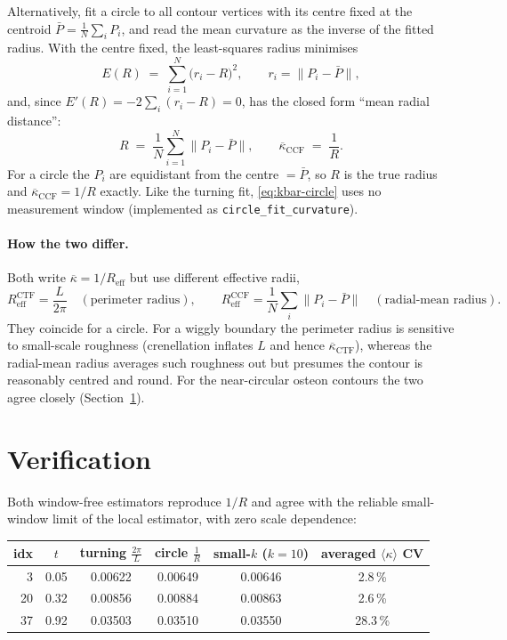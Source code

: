 \documentclass[11pt]{article}
\newcommand{\kbar}{\overline{\kappa}}
\newcommand{\code}[1]{\texttt{#1}}
\begin{document}
Alternatively, fit a circle to all contour vertices with its centre fixed at the
centroid $\bar P = \tfrac1N\sum_i P_i$, and read the mean curvature as the inverse
of the fitted radius. With the centre fixed, the least-squares radius minimises
\begin{equation}
  E(R) \;=\; \sum_{i=1}^{N}\bigl(r_i - R\bigr)^2,
  \qquad r_i = \lVert P_i - \bar P\rVert,
\end{equation}
and, since $E'(R) = -2\sum_i (r_i - R) = 0$, has the closed form ``mean radial
distance'':
\begin{equation}
  \boxed{\;
  R \;=\; \frac1N\sum_{i=1}^{N}\lVert P_i - \bar P\rVert,
  \qquad
  \kbar_{\text{CCF}} \;=\; \frac1R .
  \;}
  \label{eq:kbar-circle}
\end{equation}
For a circle the $P_i$ are equidistant from the centre $=\bar P$, so $R$ is the
true radius and $\kbar_{\text{CCF}}=1/R$ exactly. Like the turning fit,
\eqref{eq:kbar-circle} uses no measurement window (implemented as
\code{circle\_fit\_curvature}).

\paragraph{How the two differ.} Both write $\kbar = 1/R_{\text{eff}}$ but use
different effective radii,
\begin{equation}
  R_{\text{eff}}^{\text{CTF}} = \frac{L}{2\pi}
  \quad(\text{perimeter radius}),
  \qquad
  R_{\text{eff}}^{\text{CCF}} = \frac1N\sum_i \lVert P_i - \bar P\rVert
  \quad(\text{radial-mean radius}).
\end{equation}
They coincide for a circle. For a wiggly boundary the perimeter radius is
sensitive to small-scale roughness (crenellation inflates $L$ and hence
$\kbar_{\text{CTF}}$), whereas the radial-mean radius averages such roughness out
but presumes the contour is reasonably centred and round. For the near-circular
osteon contours the two agree closely (Section~\ref{sec:verify}).

\section{Verification}
\label{sec:verify}

Both window-free estimators reproduce $1/R$ and agree with the reliable
small-window limit of the local estimator, with zero scale dependence:

\begin{center}
  \begin{tabular}{rccccc}
    \toprule
    idx & $t$ & turning $\tfrac{2\pi}{L}$ & circle $\tfrac1R$ & small-$k$ ($k{=}10$) & averaged $\langle\kappa\rangle$ CV \\
    \midrule
     3 & 0.05 & 0.00622 & 0.00649 & 0.00646 & \phantom{0}2.8\,\% \\
    20 & 0.32 & 0.00856 & 0.00884 & 0.00863 & \phantom{0}2.6\,\% \\
    37 & 0.92 & 0.03503 & 0.03510 & 0.03550 & 28.3\,\% \\
    \bottomrule
  \end{tabular}
\end{center}
\end{document}
